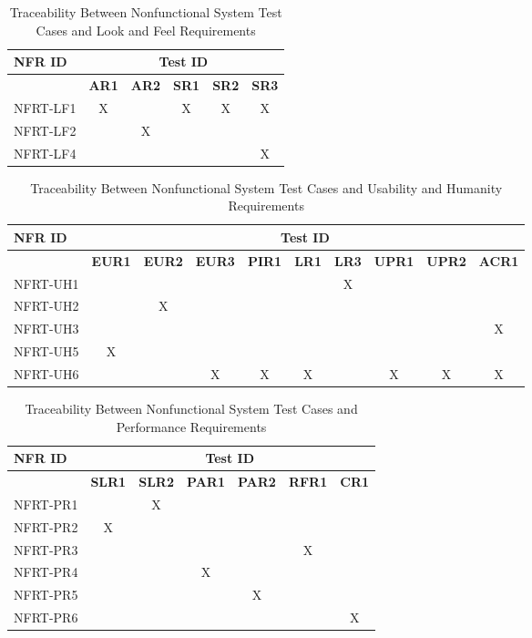 \documentclass[12pt, titlepage]{article}
\begin{document}
\begin{landscape}
  \begin{longtable}{|l|ccccc|}
		\caption{Traceability Between Nonfunctional System Test Cases and Look and Feel Requirements} \\
		\hline
    \textbf{NFR ID}   & \multicolumn{5}{c|}{\textbf{Test ID}} \\
    \hline
    ~ & \textbf{AR1} & \textbf{AR2} & \textbf{SR1} & \textbf{SR2} & \textbf{SR3} \\
    \hline
    NFRT-LF1 & X & ~ & X & X & X \\
    NFRT-LF2 & ~ & X & ~ & ~ & ~ \\
    NFRT-LF4 & ~ & ~ & ~ & ~ & X \\
    \hline
  \end{longtable}

  \newpage
  \begin{longtable}{|l|ccccccccc|}
    \caption{Traceability Between Nonfunctional System Test Cases and Usability and Humanity Requirements} \\
    \hline
    \textbf{NFR ID}   & \multicolumn{9}{c|}{\textbf{Test ID}} \\
    \hline
    ~ & \textbf{EUR1} & \textbf{EUR2} & \textbf{EUR3} & \textbf{PIR1} & \textbf{LR1} & \textbf{LR3} & \textbf{UPR1} & \textbf{UPR2} & \textbf{ACR1} \\
    \hline
    NFRT-UH1 & ~ & ~ & ~ & ~ & ~ & X & ~ & ~ & ~ \\
    NFRT-UH2 & ~ & X & ~ & ~ & ~ & ~ & ~ & ~ & ~ \\
    NFRT-UH3 & ~ & ~ & ~ & ~ & ~ & ~ & ~ & ~ & X \\
    NFRT-UH5 & X & ~ & ~ & ~ & ~ & ~ & ~ & ~ & ~ \\
    NFRT-UH6 & ~ & ~ & X & X & X & ~ & X & X & X \\
    \hline
  \end{longtable}

  \begin{longtable}{|l|cccccc|}
		\caption{Traceability Between Nonfunctional System Test Cases and Performance Requirements} \\
		\hline
    \textbf{NFR ID}   & \multicolumn{6}{c|}{\textbf{Test ID}} \\
    \hline
    ~ & \textbf{SLR1} & \textbf{SLR2} & \textbf{PAR1} & \textbf{PAR2} & \textbf{RFR1} & \textbf{CR1} \\
    \hline
    NFRT-PR1 & ~ & X & ~ & ~ & ~ & ~ \\
    NFRT-PR2 & X & ~ & ~ & ~ & ~ & ~ \\
    NFRT-PR3 & ~ & ~ & ~ & ~ & X & ~ \\
    NFRT-PR4 & ~ & ~ & X & ~ & ~ & ~ \\
    NFRT-PR5 & ~ & ~ & ~ & X & ~ & ~ \\
    NFRT-PR6 & ~ & ~ & ~ & ~ & ~ & X \\
    \hline
  \end{longtable}


\end{landscape}
\end{document}
